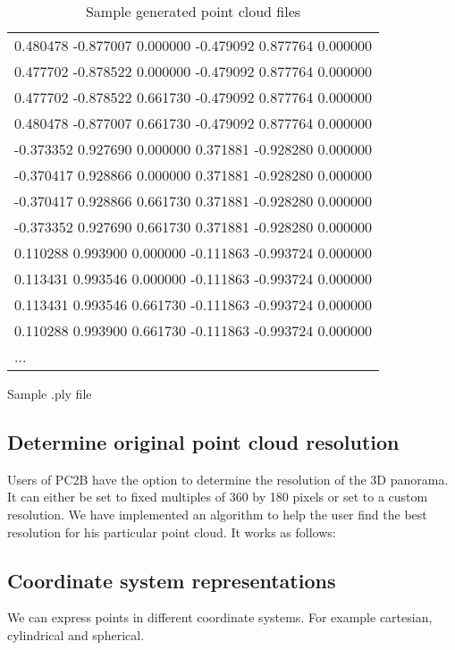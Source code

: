\begin{table}[h]
\begin{subtable}[b]{0.52\textwidth}
{\begin{tabular}{l}
			0.480478 -0.877007 0.000000 -0.479092 0.877764 0.000000 \\
			0.477702 -0.878522 0.000000 -0.479092 0.877764 0.000000 \\
			0.477702 -0.878522 0.661730 -0.479092 0.877764 0.000000 \\
			0.480478 -0.877007 0.661730 -0.479092 0.877764 0.000000 \\
			-0.373352 0.927690 0.000000 0.371881 -0.928280 0.000000 \\
			-0.370417 0.928866 0.000000 0.371881 -0.928280 0.000000 \\
			-0.370417 0.928866 0.661730 0.371881 -0.928280 0.000000 \\
			-0.373352 0.927690 0.661730 0.371881 -0.928280 0.000000 \\
			0.110288 0.993900 0.000000 -0.111863 -0.993724 0.000000 \\
			0.113431 0.993546 0.000000 -0.111863 -0.993724 0.000000 \\
			0.113431 0.993546 0.661730 -0.111863 -0.993724 0.000000 \\
			0.110288 0.993900 0.661730 -0.111863 -0.993724 0.000000 \\
			...
			
		\end{tabular}}
		\caption{Sample .ply file}
		\label{tab:ply_file}
	\end{subtable}
	\caption{Sample generated point cloud files}
	\label{tab:xyz_ply_file_structure}
\end{table}

\subsection{Determine original point cloud resolution}

Users of PC2B have the option to determine the resolution of the 3D panorama. It can either be set to fixed multiples of 360 by 180 pixels or set to a custom resolution. We have implemented an algorithm to help the user find the best resolution for his particular point cloud. It works as follows:

\subsection{Coordinate system representations}

We can express points in different coordinate systems. For example cartesian, cylindrical and spherical.

